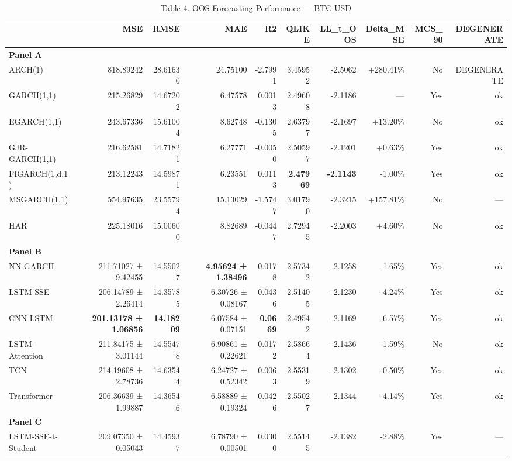 \begin{table}[ht]
\centering
\caption{Table 4. OOS Forecasting Performance — BTC-USD}
\label{tab:oos_btc-usd}
\begin{tabular}{lrrrrrrrrr}
\toprule
 & MSE & RMSE & MAE & R2 & QLIKE & LL_t_OOS & Delta_MSE & MCS_90 & DEGENERATE \\
\midrule
\multicolumn{10}{l}{\textbf{Panel A}} \\
ARCH(1) & 818.89242 & 28.61630 & 24.75100 & -2.7991 & 3.45952 & -2.5062 & +280.41\% & No & DEGENERATE \\
GARCH(1,1) & 215.26829 & 14.67202 & 6.47578 & 0.0013 & 2.49608 & -2.1186 & — & Yes & ok \\
EGARCH(1,1) & 243.67336 & 15.61004 & 8.62748 & -0.1305 & 2.63797 & -2.1697 & +13.20\% & No & ok \\
GJR-GARCH(1,1) & 216.62581 & 14.71821 & 6.27771 & -0.0050 & 2.50597 & -2.1201 & +0.63\% & Yes & ok \\
FIGARCH(1,d,1) & 213.12243 & 14.59871 & 6.23551 & 0.0113 & \textbf{2.47969} & \textbf{-2.1143} & -1.00\% & Yes & ok \\
MSGARCH(1,1) & 554.97635 & 23.55794 & 15.13029 & -1.5747 & 3.01790 & -2.3215 & +157.81\% & No & — \\
HAR & 225.18016 & 15.00600 & 8.82689 & -0.0447 & 2.72945 & -2.2003 & +4.60\% & No & ok \\
\multicolumn{10}{l}{\textbf{Panel B}} \\
NN-GARCH & 211.71027 ± 9.42455 & 14.55027 & \textbf{4.95624 ± 1.38496} & 0.0178 & 2.57342 & -2.1258 & -1.65\% & Yes & ok \\
LSTM-SSE & 206.14789 ± 2.26414 & 14.35785 & 6.30726 ± 0.08167 & 0.0436 & 2.51405 & -2.1230 & -4.24\% & Yes & ok \\
CNN-LSTM & \textbf{201.13178 ± 1.06856} & \textbf{14.18209} & 6.07584 ± 0.07151 & \textbf{0.0669} & 2.49542 & -2.1169 & -6.57\% & Yes & ok \\
LSTM-Attention & 211.84175 ± 3.01144 & 14.55478 & 6.90861 ± 0.22621 & 0.0172 & 2.58664 & -2.1436 & -1.59\% & No & ok \\
TCN & 214.19608 ± 2.78736 & 14.63544 & 6.24727 ± 0.52342 & 0.0063 & 2.55319 & -2.1302 & -0.50\% & Yes & ok \\
Transformer & 206.36639 ± 1.99887 & 14.36546 & 6.58889 ± 0.19324 & 0.0426 & 2.55027 & -2.1344 & -4.14\% & Yes & ok \\
\multicolumn{10}{l}{\textbf{Panel C}} \\
LSTM-SSE-t-Student & 209.07350 ± 0.05043 & 14.45937 & 6.78790 ± 0.00501 & 0.0300 & 2.55145 & -2.1382 & -2.88\% & Yes & — \\

\end{tabular}
\end{table}
